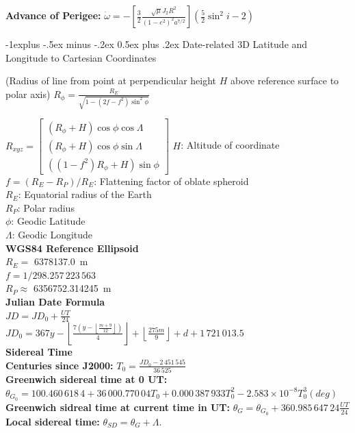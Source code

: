 \documentclass[letterpaper, 8pt]{extarticle}
\makeatletter
\renewcommand{\subsection}{\@startsection{subsection}{2}{0mm}%
                                {-1explus -.5ex minus -.2ex}%
                                {0.5ex plus .2ex}%
                                {\normalfont\small\bfseries}}
\makeatother
\begin{document}
\begin{multicols*}{4}
\textbf{Advance of Perigee:}
$
\dot{\omega} = -\left[
    \frac{3}{2} \frac{\sqrt{\mu} J_2 R^2}{(1 - e^2)^2 a^{7/2}}
\right]
\left(
    \frac{5}{2} \sin^2 i - 2
\right)
$

\subsection{Date-related 3D}
Latitude and Longitude to Cartesian Coordinates

(Radius of line from point at perpendicular height $H$ above reference surface to polar axis)
$R_\phi = \frac{R_E}{\sqrt{1 - (2f - f^2) \sin^2 \phi}}$

$R_{xyz} = 
\begin{bmatrix}
    (R_\phi + H) \cos \phi \cos \Lambda \\
    (R_\phi + H) \cos \phi \sin \Lambda \\
    ((1 - f^2) R_\phi + H) \sin \phi
\end{bmatrix}
$
$H$: Altitude of coordinate\\
$f = (R_E - R_P) / R_E$: Flattening factor of oblate spheroid\\
$R_E$: Equatorial radius of the Earth\\
$R_P$: Polar radius\\
$\phi$: Geodic Latitude\\
$\Lambda$: Geodic Longitude\\

\textbf{WGS84 Reference Ellipsoid}\\
$R_E =$ \SI{6378137.0}{\metre}\\
$f = 1/298.257\,223\,563$ \\
$R_P \approx$ \SI{6356752.314245}{\metre}\\

\textbf{Julian Date Formula}\\
$JD = JD_0 + \frac{UT}{24}$\\
$JD_0 = 367y
- \left\lfloor\frac{7(y - \left\lfloor\frac{m + 9}{12}\right\rfloor)}{4}\right\rfloor
+ \left\lfloor\frac{275m}{9}\right\rfloor
+ d
+ 1\,721\,013.5$\\

\textbf{Sidereal Time}\\
\textbf{Centuries since J2000:}
$T_0 = \frac{JD_0 - 2\,451\,545}{36\,525}$\\
\textbf{Greenwich sidereal time at 0 UT:}
$\theta_{G_0} = 100.460\,618\,4
+ 36\,000.770\,04 T_0
+ 0.000\,387\,933 T_0^2
- 2.583 \times 10^{-8} T_0^3
(deg)$\\
\textbf{Greenwich sidreal time at current time in UT:}
$\theta_G = \theta_{G_0} + 360.985\,647\,24 \frac{UT}{24}$\\
\textbf{Local sidereal time:}
$\theta_{SD} = \theta_G + \Lambda$.


\end{multicols*}
\end{document}

